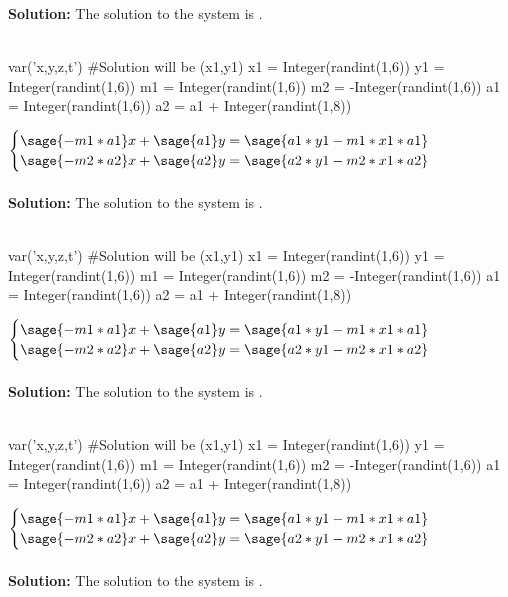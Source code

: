 \documentclass{ximera}
\begin{document}
\begin{shuffle}[1]
\begin{question}
{\bf Solution:} The solution to the system is 
.\\\\
\end{question}
\begin{question}
\begin{sagesilent}
var('x,y,z,t')
#Solution will be (x1,y1)
x1 = Integer(randint(1,6))
y1 = Integer(randint(1,6))
m1 = Integer(randint(1,6))
m2 = -Integer(randint(1,6)) 
a1 = Integer(randint(1,6))
a2 = a1 + Integer(randint(1,8))
\end{sagesilent}
$\begin{cases}
\sage{-m1*a1}x+\sage{a1}y=\sage{a1*y1-m1*x1*a1}\\
\sage{-m2*a2}x+\sage{a2}y=\sage{a2*y1-m2*x1*a2}\\
\end{cases}$\\\\

{\bf Solution:} The solution to the system is 
.\\\\
\end{question}
\begin{question}
\begin{sagesilent}
var('x,y,z,t')
#Solution will be (x1,y1)
x1 = Integer(randint(1,6))
y1 = Integer(randint(1,6))
m1 = Integer(randint(1,6))
m2 = -Integer(randint(1,6)) 
a1 = Integer(randint(1,6))
a2 = a1 + Integer(randint(1,8))
\end{sagesilent}
$\begin{cases}
\sage{-m1*a1}x+\sage{a1}y=\sage{a1*y1-m1*x1*a1}\\
\sage{-m2*a2}x+\sage{a2}y=\sage{a2*y1-m2*x1*a2}\\
\end{cases}$\\\\

{\bf Solution:} The solution to the system is 
.\\\\
\end{question}
\begin{question}
\begin{sagesilent}
var('x,y,z,t')
#Solution will be (x1,y1)
x1 = Integer(randint(1,6))
y1 = Integer(randint(1,6))
m1 = Integer(randint(1,6))
m2 = -Integer(randint(1,6)) 
a1 = Integer(randint(1,6))
a2 = a1 + Integer(randint(1,8))
\end{sagesilent}
$\begin{cases}
\sage{-m1*a1}x+\sage{a1}y=\sage{a1*y1-m1*x1*a1}\\
\sage{-m2*a2}x+\sage{a2}y=\sage{a2*y1-m2*x1*a2}\\
\end{cases}$\\\\

{\bf Solution:} The solution to the system is 
.\\\\
\end{question}

\end{shuffle}
\end{document}
